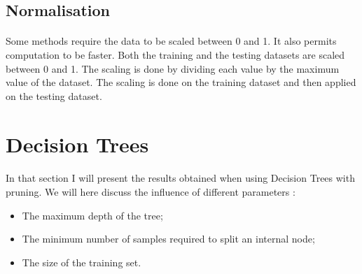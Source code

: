 \documentclass[10pt]{article}
\begin{document}
		\subsection*{Normalisation}
			\paragraph*{}
				Some methods require the data to be scaled between 0 and 1. It also permits computation to be faster. Both the training and the testing datasets are scaled between 0 and 1. The scaling is done by dividing each value by the maximum value of the dataset. The scaling is done on the training dataset and then applied on the testing dataset.
	\section{Decision Trees}
		\paragraph*{}
			In that section I will present the results obtained when using Decision Trees with pruning. We will here discuss the influence of different parameters :
			\begin{itemize}
				\item The maximum depth of the tree;
				\item The minimum number of samples required to split an internal node;
				\item The size of the training set.
			\end{itemize}
\end{document}
